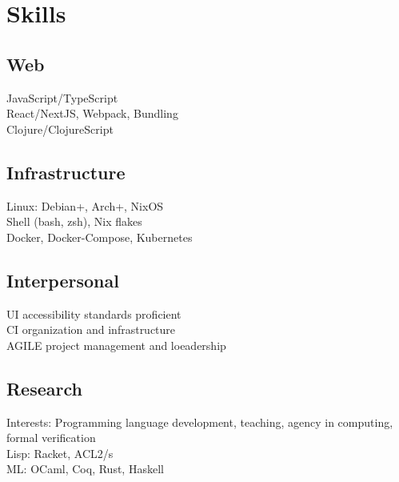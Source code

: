 \documentclass[letterpaper]{cv} %
\begin{document}
\begin{minipage}[t]{0.33\textwidth}
  \sectionspace


  \section{Skills}
  \subsection{Web}
  \textbullet{} JavaScript/TypeScript \\
  \textbullet{} React/NextJS, Webpack, Bundling \\
  \textbullet{} Clojure/ClojureScript \\
  \sectionspace
  \subsection{Infrastructure}
  \textbullet{} Linux: Debian+, Arch+, NixOS \\
  \textbullet{}Shell (bash, zsh), Nix flakes \\
  \textbullet{} Docker, Docker-Compose, Kubernetes \\

  \sectionspace
  \subsection{Interpersonal}
  \textbullet{} UI accessibility standards proficient \\
  \textbullet{} CI organization and infrastructure \\
  \textbullet{} AGILE project management and loeadership \\

  \sectionspace
  \subsection{Research}
  Interests: Programming language development,
  teaching, agency in computing, formal verification \\
  \textbullet{} Lisp: Racket, ACL2/s \\
  \textbullet{} ML: OCaml, Coq, Rust, Haskell \\
  \sectionspace


\end{minipage}
\end{document}
